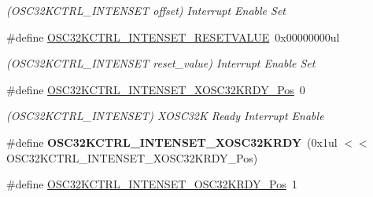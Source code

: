 \begin{DoxyCompactItemize}
\begin{DoxyCompactList}\small\item\em (O\+S\+C32\+K\+C\+T\+R\+L\+\_\+\+I\+N\+T\+E\+N\+S\+E\+T offset) Interrupt Enable Set \end{DoxyCompactList}\item 
\hypertarget{group___s_a_m_l21___o_s_c32_k_c_t_r_l_ga50b1ca7855eb0e99ad3619bb83f08d14}{}\#define \hyperlink{group___s_a_m_l21___o_s_c32_k_c_t_r_l_ga50b1ca7855eb0e99ad3619bb83f08d14}{O\+S\+C32\+K\+C\+T\+R\+L\+\_\+\+I\+N\+T\+E\+N\+S\+E\+T\+\_\+\+R\+E\+S\+E\+T\+V\+A\+L\+U\+E}~0x00000000ul\label{group___s_a_m_l21___o_s_c32_k_c_t_r_l_ga50b1ca7855eb0e99ad3619bb83f08d14}

\begin{DoxyCompactList}\small\item\em (O\+S\+C32\+K\+C\+T\+R\+L\+\_\+\+I\+N\+T\+E\+N\+S\+E\+T reset\+\_\+value) Interrupt Enable Set \end{DoxyCompactList}\item 
\hypertarget{group___s_a_m_l21___o_s_c32_k_c_t_r_l_gaf952ca2a3c0659258f67df4af0455662}{}\#define \hyperlink{group___s_a_m_l21___o_s_c32_k_c_t_r_l_gaf952ca2a3c0659258f67df4af0455662}{O\+S\+C32\+K\+C\+T\+R\+L\+\_\+\+I\+N\+T\+E\+N\+S\+E\+T\+\_\+\+X\+O\+S\+C32\+K\+R\+D\+Y\+\_\+\+Pos}~0\label{group___s_a_m_l21___o_s_c32_k_c_t_r_l_gaf952ca2a3c0659258f67df4af0455662}

\begin{DoxyCompactList}\small\item\em (O\+S\+C32\+K\+C\+T\+R\+L\+\_\+\+I\+N\+T\+E\+N\+S\+E\+T) X\+O\+S\+C32\+K Ready Interrupt Enable \end{DoxyCompactList}\item 
\hypertarget{group___s_a_m_l21___o_s_c32_k_c_t_r_l_gab6791e6053589baa831f510e92f28557}{}\#define {\bfseries O\+S\+C32\+K\+C\+T\+R\+L\+\_\+\+I\+N\+T\+E\+N\+S\+E\+T\+\_\+\+X\+O\+S\+C32\+K\+R\+D\+Y}~(0x1ul $<$$<$ O\+S\+C32\+K\+C\+T\+R\+L\+\_\+\+I\+N\+T\+E\+N\+S\+E\+T\+\_\+\+X\+O\+S\+C32\+K\+R\+D\+Y\+\_\+\+Pos)\label{group___s_a_m_l21___o_s_c32_k_c_t_r_l_gab6791e6053589baa831f510e92f28557}

\item 
\hypertarget{group___s_a_m_l21___o_s_c32_k_c_t_r_l_ga43a93124add2a247c05b54cbbe0d5e1c}{}\#define \hyperlink{group___s_a_m_l21___o_s_c32_k_c_t_r_l_ga43a93124add2a247c05b54cbbe0d5e1c}{O\+S\+C32\+K\+C\+T\+R\+L\+\_\+\+I\+N\+T\+E\+N\+S\+E\+T\+\_\+\+O\+S\+C32\+K\+R\+D\+Y\+\_\+\+Pos}~1\label{group___s_a_m_l21___o_s_c32_k_c_t_r_l_ga43a93124add2a247c05b54cbbe0d5e1c}


\end{DoxyCompactItemize}
